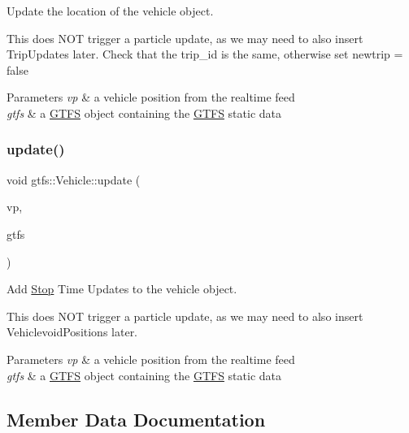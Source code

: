 Update the location of the vehicle object.

This does N\+OT trigger a particle update, as we may need to also insert Trip\+Updates later. Check that the trip\+\_\+id is the same, otherwise set {\ttfamily newtrip = false}


\begin{DoxyParams}{Parameters}
{\em vp} & a vehicle position from the realtime feed \\
\hline
{\em gtfs} & a \hyperlink{classgtfs_1_1GTFS}{G\+T\+FS} object containing the \hyperlink{classgtfs_1_1GTFS}{G\+T\+FS} static data \\
\hline
\end{DoxyParams}
\mbox{\label{classgtfs_1_1Vehicle_ae9944f06fb0bde02f2d7c21f2dc33787}} 
\subsubsection{\texorpdfstring{update()}{update()}\hspace{0.1cm}{\footnotesize\ttfamily [3/3]}}
{\footnotesize\ttfamily void gtfs\+::\+Vehicle\+::update (\begin{DoxyParamCaption}\item[{const transit\+\_\+realtime\+::\+Trip\+Update \&}]{vp,  }\item[{\hyperlink{classgtfs_1_1GTFS}{G\+T\+FS} \&}]{gtfs }\end{DoxyParamCaption})}

Add \hyperlink{classgtfs_1_1Stop}{Stop} Time Updates to the vehicle object.

This does N\+OT trigger a particle update, as we may need to also insert Vehiclevoid\+Positions later.


\begin{DoxyParams}{Parameters}
{\em vp} & a vehicle position from the realtime feed \\
\hline
{\em gtfs} & a \hyperlink{classgtfs_1_1GTFS}{G\+T\+FS} object containing the \hyperlink{classgtfs_1_1GTFS}{G\+T\+FS} static data \\
\hline
\end{DoxyParams}


\subsection{Member Data Documentation}
\mbox{\label{classgtfs_1_1Vehicle_aa21babc8423abf92bbdf5e0748444f44}} 
